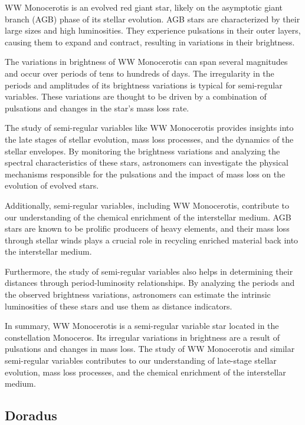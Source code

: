 WW Monocerotis is an evolved red giant star, likely on the asymptotic giant branch (AGB) phase of its stellar evolution. AGB stars are characterized by their large sizes and high luminosities. They experience pulsations in their outer layers, causing them to expand and contract, resulting in variations in their brightness.

The variations in brightness of WW Monocerotis can span several magnitudes and occur over periods of tens to hundreds of days. The irregularity in the periods and amplitudes of its brightness variations is typical for semi-regular variables. These variations are thought to be driven by a combination of pulsations and changes in the star's mass loss rate.

The study of semi-regular variables like WW Monocerotis provides insights into the late stages of stellar evolution, mass loss processes, and the dynamics of the stellar envelopes. By monitoring the brightness variations and analyzing the spectral characteristics of these stars, astronomers can investigate the physical mechanisms responsible for the pulsations and the impact of mass loss on the evolution of evolved stars.

Additionally, semi-regular variables, including WW Monocerotis, contribute to our understanding of the chemical enrichment of the interstellar medium. AGB stars are known to be prolific producers of heavy elements, and their mass loss through stellar winds plays a crucial role in recycling enriched material back into the interstellar medium.

Furthermore, the study of semi-regular variables also helps in determining their distances through period-luminosity relationships. By analyzing the periods and the observed brightness variations, astronomers can estimate the intrinsic luminosities of these stars and use them as distance indicators.

In summary, WW Monocerotis is a semi-regular variable star located in the constellation Monoceros. Its irregular variations in brightness are a result of pulsations and changes in mass loss. The study of WW Monocerotis and similar semi-regular variables contributes to our understanding of late-stage stellar evolution, mass loss processes, and the chemical enrichment of the interstellar medium.




\subsection{Doradus}

